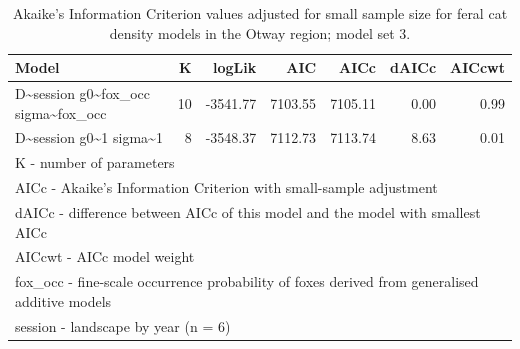 \documentclass[preprint, 3p, authoryear]{elsarticle} %
\begin{document}
\begingroup\fontsize{10}{12}\selectfont

\begin{longtable}[t]{lrrrrrr}
\caption{\label{tab:density-aic-o-4}Akaike's Information Criterion values adjusted for small sample size for feral cat density models in the Otway region; model set 3.}\\
\toprule
Model & K & logLik & AIC & AICc & dAICc & AICcwt\\
\midrule
D\textasciitilde{}session g0\textasciitilde{}fox\_occ sigma\textasciitilde{}fox\_occ & 10 & -3541.77 & 7103.55 & 7105.11 & 0.00 & 0.99\\
D\textasciitilde{}session g0\textasciitilde{}1 sigma\textasciitilde{}1 & 8 & -3548.37 & 7112.73 & 7113.74 & 8.63 & 0.01\\
\bottomrule
\multicolumn{7}{l}{\rule{0pt}{1em}K - number of parameters}\\
\multicolumn{7}{l}{\rule{0pt}{1em}AICc - Akaike's Information Criterion with small-sample adjustment}\\
\multicolumn{7}{l}{\rule{0pt}{1em}dAICc - difference between AICc of this model and the model with smallest AICc}\\
\multicolumn{7}{l}{\rule{0pt}{1em}AICcwt - AICc model weight}\\
\multicolumn{7}{l}{\rule{0pt}{1em}fox\_occ - fine-scale occurrence probability of foxes derived from generalised additive models}\\
\multicolumn{7}{l}{\rule{0pt}{1em}session - landscape by year (n = 6)}\\
\end{longtable}
\endgroup{}

\newpage

\begingroup\fontsize{10}{12}\selectfont
\end{document}
